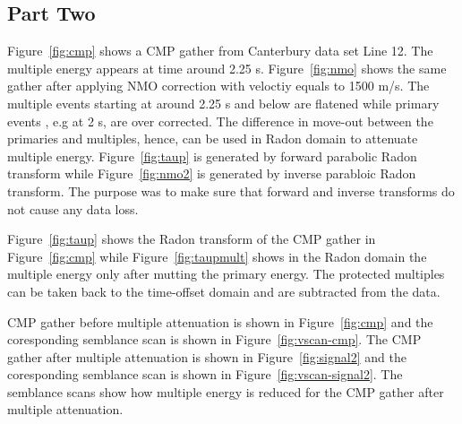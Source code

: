\subsection{Part Two}




Figure~\ref{fig:cmp} shows a CMP gather from Canterbury data set Line 12. The multiple energy appears at time around 2.25 s. Figure~\ref{fig:nmo} shows the same gather after applying NMO correction with veloctiy equals to 1500 m/s. The multiple events starting at around 2.25 s and below are flatened while primary events , e.g at 2 s,  are over corrected. The difference in move-out between the primaries and multiples, hence, can be used in Radon domain to attenuate multiple energy. Figure~\ref{fig:taup} is generated by forward parabolic Radon transform while Figure~\ref{fig:nmo2} is generated by inverse parabloic Radon transform. The purpose was to make sure that forward and inverse transforms do not cause any data loss.



Figure~\ref{fig:taup} shows the Radon transform of the CMP gather in Figure~\ref{fig:cmp} while Figure~\ref{fig:taupmult} shows in the Radon domain the multiple energy only after mutting the primary energy. The protected multiples can be taken back to the time-offset domain and are subtracted from the data.


CMP gather before multiple attenuation is shown in Figure~\ref{fig:cmp} and the coresponding semblance scan is shown in Figure~\ref{fig:vscan-cmp}. The CMP gather after multiple attenuation is shown in Figure~\ref{fig:signal2} and the coresponding semblance scan is shown in Figure~\ref{fig:vscan-signal2}. The semblance scans show how multiple energy is reduced for the CMP gather after multiple attenuation.

